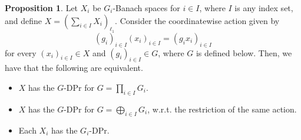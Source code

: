 \documentclass[a4paper,12pt]{amsart}
\theoremstyle{definition}
\newtheorem{proposition}[theorem]{Proposition}
\theoremstyle{definition}
\theoremstyle{remark}
\numberwithin{equation}{section}
\newcommand{\<}{\langle}
\renewcommand{\>}{\rangle}
\begin{document}
	\begin{proposition} \label{stability-ell1}
		Let $X_i$ be $G_i$-Banach spaces for $i \in I$, where $I$ is any index set, and define $X = \left(\sum_{i \in I} X_i\right)_{\ell_1}$. Consider the coordinatewise action given by
		\begin{equation*}
			(g_i)_{i \in I}(x_i)_{i \in I} = (g_i x_i)_{i \in I}
		\end{equation*}
		for every $(x_i)_{i \in I} \in X$ and $(g_i)_{i \in I} \in G$, where $G$ is defined below. Then, we have that the following are equivalent.
		\begin{itemize}
			\item[(a)] $X$ has the $G$-DPr for $G = \prod_{i\in I} G_i$.
			\item[(b)] $X$ has the $G$-DPr for $G = \bigoplus_{i \in I} G_i$, w.r.t. the restriction of the same action.
			\item[(c)] Each $X_i$ has the $G_i$-DPr.
		\end{itemize}
	\end{proposition}
	
\end{document}

